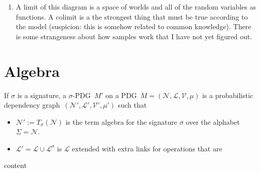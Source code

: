 \documentclass{article}
\newcommand{\modelname}{probabilistic dependency graph}
\newcommand{\MN}{PDG}
\begin{document}
\begin{vcat}
\begin{enumerate}
			\item A limit of this diagram is a space of worlds and all of the random variables as functions. A colimit is a the strongest thing that must be true according to the model (suspicion: this is somehow related to common knowledge). There is some strangeness about how samples work that I have not yet figured out.
		\end{enumerate}
		
		
		\section{Algebra}\label{sec:algebra}
		\begin{defn}
			If $\sigma$ is a signature, a $\sigma$-\MN\ $M'$ on a \MN\ $M=(\mathcal N, \mathcal L, \mathcal V, \mu)$ is a \modelname\ $(\mathcal N', \mathcal L', \mathcal V', \mu')$ such that
			\begin{itemize}
				\item $\mathcal N':= T_\sigma(\mathcal N)$ is the term algebra for the signature $\sigma$ over the alphabet $\Sigma = \mathcal N$.
				\item $\mathcal L' = \mathcal L \cup \mathcal L^\sigma$ is $\mathcal L$ extended with extra links for operations that are 
			\end{itemize}
		\end{defn}
		
		\begin{example}
			content
		\end{example}		
	\end{vcat}
	
		
	
\end{document}

